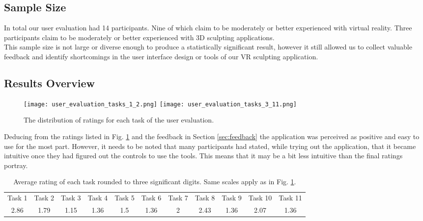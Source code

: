 \subsection{Sample Size}

In total our user evaluation had 14 participants. Nine of which claim to be moderately or better experienced with virtual reality. Three participants claim to be moderately or better experienced with 3D sculpting applications.\\
This sample size is not large or diverse enough to produce a statistically significant result, however it still allowed us to collect valuable feedback and identify shortcomings in the user interface design or tools of our VR sculpting application.

\subsection{Results Overview}

\begin{figure}
\centering
\captionsetup{width=0.8\textwidth}
\texttt{[image: user\_evaluation\_tasks\_1\_2.png]}
\texttt{[image: user\_evaluation\_tasks\_3\_11.png]}
\caption{The distribution of ratings for each task of the user evaluation.}
\label{fig:user_evaluation_ratings}
\end{figure}

Deducing from the ratings listed in Fig. \ref{fig:user_evaluation_ratings} and the feedback in Section \ref{sec:feedback} the application was perceived as positive and easy to use for the most part. However, it needs to be noted that many participants had stated, while trying out the application, that it became intuitive once they had figured out the controls to use the tools. This means that it may be a bit less intuitive than the final ratings portray.

\begin{table}[ht]
\captionsetup{width=0.8\textwidth}
\caption{Average rating of each task rounded to three significant digits. Same scales apply as in Fig. \ref{fig:user_evaluation_ratings}.}
\centering
\footnotesize
\begin{tabular}{||c c c c c c c c c c c||}
	\hline
	Task 1 & Task 2 & Task 3 & Task 4 & Task 5 & Task 6 & Task 7 & Task 8 & Task 9 & Task 10 & Task 11\\ [0.5ex] \hhline{||===========||}
	2.86 & 1.79 & 1.15 & 1.36 & 1.5 & 1.36 & 2 & 2.43 & 1.36 & 2.07 & 1.36\\ 
	\hline
\end{tabular}
\label{table:user_evaluation_averages}
\end{table}

